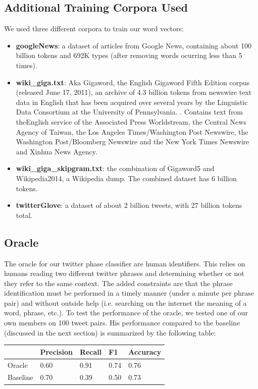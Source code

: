 \documentclass[conference]{IEEEtran}
\begin{document}
\subsection{Additional Training Corpora Used}
\label{corpora}
We used three different corpora to train our word vectors:\\
\begin{itemize}
\item \textbf{googleNews}: a dataset of articles from Google News, containing about 100 billion tokens and  692K types (after removing words ocurring less than 5 times). \cite{Mikolov}
\item \textbf{wiki\_giga.txt}: Aka Gigaword, the English Gigaword Fifth Edition corpus (released June 17, 2011), an archive of 4.3 billion tokens from newswire text data in English that has been acquired over several years by the Linguistic Data Consortium at the University of Pennsylvania. \cite{Gigaword}.  Contains text from theEnglish service of the Associated Press Worldstream, the Central News Agency of Taiwan, the Los Angeles Times/Washington Post Newswire, the Washington Post/Bloomberg Newswire and the New York Times Newswire and Xinhua News Agency.
\item \textbf{wiki\_giga\_skipgram.txt}: the combination of Gigaword5 and Wikipedia2014, a Wikipedia dump.  The combined dataset has 6 billion tokens. \cite{Mikolov}
\item \textbf{twitterGlove}: a dataset of about 2 billion tweets, with 27 billion tokens total. \cite{GloVe}

\end{itemize}

\subsection{Oracle}
The oracle for our twitter phase classifier are human identifiers. This relies on humans reading two different twitter phrases and determining whether or not they refer to the same context. The added constraints are that the phrase identification must be performed in a timely manner (under a minute per phrase pair) and without outside help (i.e. searching on the internet the meaning of a word, phrase, etc.).  To test the performance of the oracle, we tested one of our own members on 100 tweet pairs.  His performance compared to the baseline (discussed in the next section) is summarized by the following table:

\begin{table}[h]
\begin{tabular}{lllll}
         & Precision & Recall & F1   & Accuracy \\
\hline
Oracle   & 0.60      & 0.91   & 0.74 & 0.76     \\
Baseline & 0.70      & 0.39   & 0.50 & 0.73     \\ 
\end{tabular}
\end{table}
\end{document}
